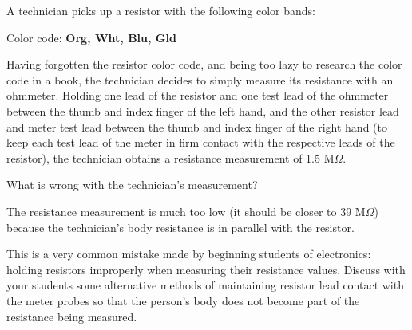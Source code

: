 

A technician picks up a resistor with the following color bands:

\vskip 10pt

\noindent
Color code: {\bf Org, Wht, Blu, Gld}

\vskip 10pt

Having forgotten the resistor color code, and being too lazy to research the color code in a book, the technician decides to simply measure its resistance with an ohmmeter.  Holding one lead of the resistor and one test lead of the ohmmeter between the thumb and index finger of the left hand, and the other resistor lead and meter test lead between the thumb and index finger of the right hand (to keep each test lead of the meter in firm contact with the respective leads of the resistor), the technician obtains a resistance measurement of 1.5 M$\Omega$.

What is wrong with the technician's measurement?







The resistance measurement is much too low (it should be closer to 39 M$\Omega$) because the technician's body resistance is in parallel with the resistor.







This is a very common mistake made by beginning students of electronics: holding resistors improperly when measuring their resistance values.  Discuss with your students some alternative methods of maintaining resistor lead contact with the meter probes so that the person's body does not become part of the resistance being measured.




